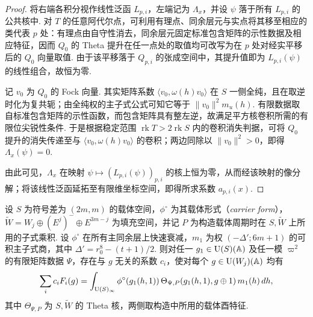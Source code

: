 \begin{proof}
将右端各积分视作线性泛函 $L_{p,i}$，左端记为 $\Lambda_x$，并设 $\psi$ 落于所有 $L_{p,i}$ 的公共核中. 对 $T$ 的任意阿代尔点，可利用有理点、同余层元与实点将其移至相应的类代表 $p$ 处：有理点由自守性消去，同余层元固定标准包含矩阵的示性数据及相应特征，因而 $Q_0$ 的 Theta 提升在任一点处的取值均可改写为在 $p$ 处对经实平移后的 $Q_0$ 向量取值. 由于该平移落于 $Q_{p,i}$ 的张成空间中，其提升值即为 $L_{p,i}(\psi)$ 的线性组合，故恒为零.

记 $v_0$ 为 $Q_0$ 的 Fock 向量. 其实矩阵系数 $\langle v_0,\omega(h)v_0\rangle$ 在 $S$ 一侧全纯，且在取逆时化为复共轭；由全纯权的主子式公式可知它等于 $\|v_0\|^2 m_u(h)$. 有限数据取自标准包含矩阵的示性函数，而包含矩阵具有整左逆，故满足平方核卷积所需的有限位尖锐性条件. 于是根据稳定范围 $\operatorname{rk}T>2\operatorname{rk}S$ 内的卷积消失判据，可将 $Q_0$ 提升的消失传递至与 $\langle v_0,\omega(h)v_0\rangle$ 的卷积；两边同除以 $\|v_0\|^2>0$，即得 $\Lambda_x(\psi)=0$.

由此可见，$\Lambda_x$ 在映射 $\psi\mapsto(L_{p,i}(\psi))_{p,i}$ 的核上恒为零，从而经该映射的像分解；将该线性泛函延拓至有限维坐标空间，即得所求系数 $a_{p,i}(x)$.
\end{proof}

\begin{lemma}[载体实积分的有限张成]
\label{lem:c-kernel-carrier-span}
\emitthmsource
设 $S$ 为符号差为 $(2m,m)$ 的载体空间，$\phi^\circ$ 为其载体形式（\emph{carrier form}），$\widetilde W=W_j\oplus(E^j)^-\oplus E^{3m-j}$ 为填充空间，并记 $P$ 为构造载体周期时在 $S,\widetilde W$ 上所用的子式乘积. 设 $\phi^\circ$ 在所有主同余层上快速衰减，$m_1$ 为权 $(-\Delta';6m+1)$ 的可积主子式商，其中 $\Delta'=r_0^8-(t+1)/2$. 则对任一 $g_1\in \operatorname{U}(S)(\mathbb A)$ 及任一模 $\varpi^2$ 的有限矩阵数据 $\Psi$，存在与 $g$ 无关的系数 $c_i$，使对每个 $g\in \operatorname{U}(W_j)(\mathbb A)$ 均有
\[
 \sum_i c_iF_i(g)=
 \int_{\operatorname{U}(S)_\infty}
 \phi^\circ(g_1(h,1))\,\Theta_{\Psi,P}(g_1(h,1),g\oplus1)\,m_1(h)\,dh ,
\]
其中 $\Theta_{\Psi,P}$ 为 $S,\widetilde W$ 的 Theta 核，两侧取构造中所用的载体酉特征.
\end{lemma}

